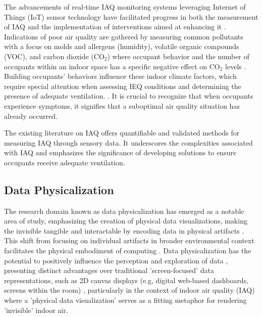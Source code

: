 The advancements of real-time IAQ monitoring systems leveraging Internet of Things (IoT) sensor technology have facilitated progress in both the measurement of IAQ and the implementation of interventions aimed at enhancing it \cite{pantelic_transformational_2022}. Indications of poor air quality are gathered by measuring common pollutants with a focus on molds and allergens (humidity), volatile organic compounds (VOC), and carbon dioxide (CO$_{2}$) \cite{klepeis_national_2001} where occupant behavior and the number of occupants within an indoor space has a specific negative effect on CO$_{2}$ levels \cite{fromme_indoor_2023}. Building occupants' behaviors influence these indoor climate factors, which require special attention when assessing IEQ conditions and determining the presence of adequate ventilation. \cite{du_indoor_2020}. It is crucial to recognize that when occupants experience symptoms, it signifies that a suboptimal air quality situation has already occurred.

The existing literature on IAQ offers quantifiable and validated methods for measuring IAQ through sensory data. It underscores the complexities associated with IAQ and emphasizes the significance of developing solutions to ensure occupants receive adequate ventilation.


\subsection{Data Physicalization}
\label{sec:phys}

The research domain known as data physicalization \cite{alexander_data_2019, jansen_opportunities_2015} has emerged as a notable area of study, emphasizing the creation of physical data visualizations, making the invisible tangible and interactable by encoding data in physical artifacts \cite{ranasinghe_encoding_2023}. This shift from focusing on individual artifacts in broader environmental context facilitates the physical embodiment of computing \cite{dragicevic_data_2020}. Data physicalization has the potential to positively influence the perception and exploration of data \cite{jansen_opportunities_2015, wang_emotional_2019, stusak_evaluating_2015}, presenting distinct advantages over traditional 'screen-focused' data representations, such as 2D canvas displays (e.g, digital web-based dashboards, screens within the room) \cite{hornecker_design_2023, jansen_evaluating_2013}, particularly in the context of indoor air quality (IAQ) where a 'physical data visualization' serves as a fitting metaphor for rendering 'invisible' indoor air. 

